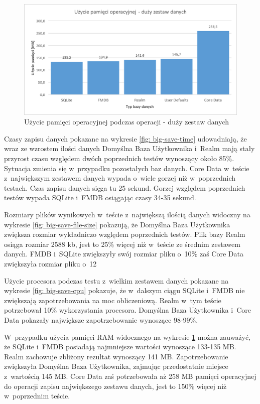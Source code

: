\begin{figure}[H]
\centering
	\includegraphics[width=15cm]{img/save_data/save_ram_big.png}
	\caption{Użycie pamięci operacyjnej podczas operacji - duży zestaw danych}
	\label{fig: big-save-ram}
\end{figure}

\newpage

Czasy zapisu danych pokazane na wykresie \ref{fig: big-save-time} udowadniają, że wraz ze wzrostem ilości danych Domyślna Baza Użytkownika i~Realm mają stały przyrost czasu względem dwóch poprzednich testów wynoszący około 85\%. Sytuacja zmienia się w~przypadku pozostałych baz danych. Core Data w~teście z~największym zestawem danych wypada o~wiele gorzej niż w~poprzednich testach. Czas zapisu danych sięga tu 25 sekund. Gorzej względem poprzednich testów wypada SQLite i~FMDB osiągając czasy 34-35 sekund. 

Rozmiary plików wynikowych w~teście z~największą ilością danych widoczny na wykresie \ref{fig: big-save-file-size} pokazują, że Domyślna Baza Użytkownika zwiększa rozmiar wykładniczo względem poprzednich testów. Plik bazy Realm osiąga rozmiar 2588 kb, jest to 25\% więcej niż w~teście ze średnim zestawem danych. FMDB i~SQLite zwiększyły swój rozmiar pliku o~10\% zaś Core Data zwiększyła rozmiar pliku o~12%

Użycie procesora podczas testu z~wielkim zestawem danych pokazane na wykresie \ref{fig: big-save-cpu} pokazuje, że w~dalszym ciągu SQLite i~FMDB nie zwiększają zapotrzebowania na moc obliczeniową. Realm w~tym teście potrzebował 10\% wykorzystania procesora. Domyślna Baza Użytkownika i~Core Data pokazały największe zapotrzebowanie wynoszące 98-99\%. 

 W~przypadku użycia pamięci RAM widocznego na wykresie \ref{fig: big-save-ram} można zauważyć, że SQLite i~FMDB posiadają najmniejsze wartości wynoszące 133-135 MB. Realm zachowuje zbliżony rezultat wynoszący 141 MB. Zapotrzebowanie zwiększyła Domyślna Baza Użytkownika, zajmując przedostatnie miejsce z~wartością 145 MB. Core Data zaś potrzebowała aż 258 MB pamięci operacyjnej do operacji zapisu największego zestawu danych, jest to 150\% więcej niż w~poprzednim teście. 

